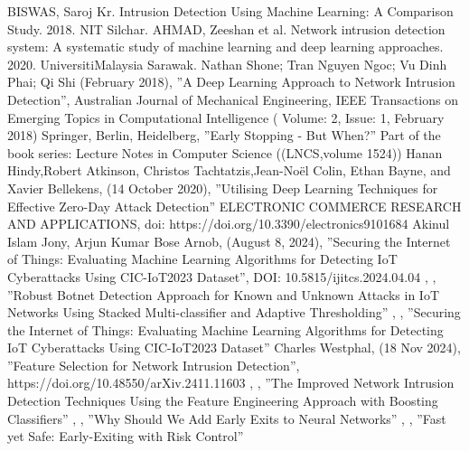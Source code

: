 \documentclass[conference]{IEEEtran}
\begin{document}
\begin{thebibliography}{00}

BISWAS, Saroj Kr. Intrusion Detection Using Machine Learning: A Comparison Study. 2018. NIT Silchar.
AHMAD, Zeeshan et al. Network intrusion detection system: A systematic study of machine learning and deep learning approaches. 2020. UniversitiMalaysia Sarawak.
 Nathan Shone; Tran Nguyen Ngoc; Vu Dinh Phai; Qi Shi  (February 2018), ''A Deep Learning Approach to Network Intrusion Detection'', Australian Journal of Mechanical Engineering, IEEE Transactions on Emerging Topics in Computational Intelligence ( Volume: 2, Issue: 1, February 2018)
 Springer, Berlin, Heidelberg, ''Early Stopping - But When?'' Part of the book series: Lecture Notes in Computer Science ((LNCS,volume 1524))
 Hanan Hindy,Robert Atkinson, Christos Tachtatzis,Jean-Noël Colin, Ethan Bayne, and Xavier Bellekens, (14 October 2020), ''Utilising Deep Learning Techniques for Effective Zero-Day Attack Detection'' ELECTRONIC COMMERCE RESEARCH AND APPLICATIONS, doi: https://doi.org/10.3390/electronics9101684
 Akinul Islam Jony, Arjun Kumar Bose Arnob, (August 8, 2024), ''Securing the Internet of Things: Evaluating Machine Learning Algorithms for Detecting IoT Cyberattacks Using CIC-IoT2023 Dataset'', DOI: 10.5815/ijitcs.2024.04.04
 , , ''Robust Botnet Detection Approach for Known and Unknown Attacks in IoT Networks Using Stacked Multi-classifier and Adaptive Thresholding''
 , , ''Securing the Internet of Things: Evaluating Machine Learning Algorithms for Detecting IoT Cyberattacks Using CIC-IoT2023 Dataset''
 Charles Westphal, (18 Nov 2024), ''Feature Selection for Network Intrusion Detection'', https://doi.org/10.48550/arXiv.2411.11603
 , , ''The Improved Network Intrusion Detection Techniques Using the Feature Engineering Approach with Boosting Classifiers''
 , , ''Why Should We Add Early Exits to Neural Networks''
 , , ''Fast yet Safe: Early-Exiting with Risk Control''

\end{thebibliography}
\end{document}
